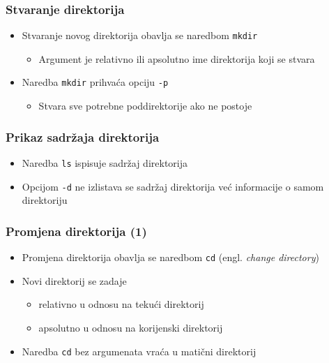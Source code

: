 \documentclass{beamer}
\begin{document}
\begin{frame}[t]
\frametitle{Stvaranje direktorija}
\begin{itemize}
  \item Stvaranje novog direktorija obavlja se naredbom \texttt{mkdir}
  \begin{itemize}
    \item Argument je relativno ili apsolutno ime direktorija koji se
          stvara
  \end{itemize}
  \item Naredba \texttt{mkdir} prihvaća opciju \texttt{-p}
  \begin{itemize}
    \item Stvara sve potrebne poddirektorije ako ne postoje
  \end{itemize}
\end{itemize}
\end{frame}

\begin{frame}[t]
\frametitle{Prikaz sadržaja direktorija}
\begin{itemize}
  \item Naredba \texttt{ls} ispisuje sadržaj direktorija
  \item Opcijom \texttt{-d} ne izlistava se sadržaj direktorija već
        informacije o samom direktoriju
\end{itemize}
\end{frame}


\begin{frame}[t]
\frametitle{Promjena direktorija (1)}
\begin{itemize}
  \item Promjena direktorija obavlja se naredbom \texttt{cd} (engl.
        \emph{change directory})
  \item Novi direktorij se zadaje
  \begin{itemize}
    \item relativno u odnosu na tekući direktorij
    \item apsolutno u odnosu na korijenski direktorij
  \end{itemize}
  \item Naredba \texttt{cd} bez argumenata vraća u matični direktorij
\end{itemize}
\end{frame}
\end{document}
